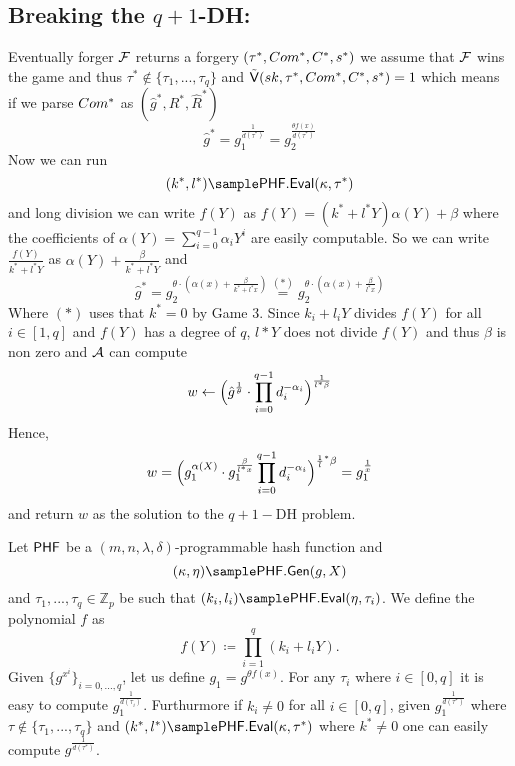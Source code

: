 \subsection*{Breaking the $q+1$-DH:}
Eventually forger $\mathcal{F}$ returns a forgery $(\tau^*,Com^*,C^*,s^*)$ we assume that $\mathcal{F}$ wins the game and thus $\tau^* \notin \{\tau_1,...,\tau_q\}$ and 
$\tilde{\mathsf{V}}(sk, \tau^*,Com^*,C^*,s^*) = 1$ which means if we parse $Com^*$ as $(\hat{g}^*,R^*,\hat{R}^*)$
$$\hat{g}^* = g_1^{\frac{1}{d(\tau^*)}} = g_2^{\frac{\theta f(x)}{d(\tau^*)}}$$
Now we can run 
$$(k^*,l^*) \sample \phfEval(\kappa, \tau^*)$$
and long division we can write $f(Y)$ as $f(Y) = (k^*+l^*Y)\alpha(Y) + \beta$  where the coefficients of $\alpha(Y) = \sum_{i=0}^{q-1} \alpha_iY^i$ are easily computable. So we can write $\frac{f(Y)}{k^*+l^*Y}$ as $\alpha(Y) + \frac{\beta}{k^*+l^*Y}$ and 
$$\hat{g}^* = g_2^{\theta\cdot(\alpha(x) + \frac{\beta}{k^*+l^*x})} \stackrel{(*)}{=} g_2^{\theta\cdot(\alpha(x) + \frac{\beta}{l^*x})}$$
Where $(*)$ uses that $k^* = 0$ by Game 3.
Since $k_i +l_iY$ divides $f(Y)$ for all $i\in [1,q]$ and $f(Y)$ has a degree of $q$, $l*Y$ does not divide $f(Y)$ and thus $\beta$ is non zero and $\mathcal{A}$ can compute
$$w \leftarrow \Big{(} \hat{g}^{\frac{1}{\theta}} \cdot \prod_{i=0}^{q-1} d_i^{-\alpha_i}\Big{)}^{\frac{1}{l^*\beta}}$$
Hence,
$$w =\Big{(} g_1^{\alpha(X)}\cdot g_1^{\frac{\beta}{l^*x}}  \prod_{i=0}^{q-1} d_i^{-\alpha_i}\Big{)}^{\frac{1}l^*{\beta }} = g_1^{\frac{1}{x}}$$
and return $w$ as the solution to the  $q+1-$DH problem.

\begin{lemma}
	Let $\mathsf{PHF}$ be a $(m,n, \lambda, \delta)$-programmable hash function and 
	$$(\kappa, \eta)\sample \phfGen(g,X)$$
	and $\tau_1,...,\tau_q \in \mathbb{Z}_p$ be such that
	$(k_i,l_i) \sample \phfEval(\eta,\tau_i)$.
	We define the polynomial $f$ as 
	$$f(Y) \coloneqq \prod_{i=1}^q (k_i + l_iY).$$
	Given $\{g^{x^i}\}_{i=0,...,q}$, let us define $g_1 = g^{\theta f(x)}$. For any $\tau_i$ where $i \in [0,q]$ it is easy to compute $g_1^\frac{1}{d(\tau_i) }$. Furthurmore if $k_i \neq 0$ for all $i \in [0,q]$, given 
	$g_1^\frac{1}{d(\tau^*) }$ where $\tau \notin \{\tau_1,...,\tau_q\}$ and $(k^*,l^*) \sample \phfEval(\kappa, \tau^*)$ where $k^* \neq 0$ one can easily compute $g^\frac{1}{d(\tau^*)}$.

\end{lemma}

